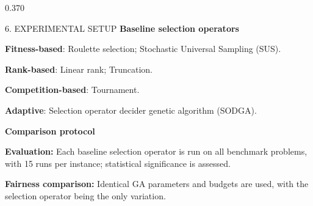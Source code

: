 \documentclass[final]{beamer}
\newcommand{\FSSubhead}{\fontsize{26}{32}\selectfont}    %
\newcommand{\FSBody}{\fontsize{24.5}{30.5}\selectfont}   %
\newcommand{\PosterSubheadGap}{2mm}
\newcommand{\postersubhead}[1]{{\color{bguBlue}\FSSubhead\bfseries #1}\par\vspace{\PosterSubheadGap}}
\newcommand{\leftcompactitem}[2]{%
  \par\vspace{2.0mm}\noindent
  \begin{minipage}[c]{0.11\linewidth}\centering\textcolor{bguMid}{\fontsize{27}{27}\selectfont #1}\end{minipage}%
  \hfill
  \begin{minipage}[c]{0.86\linewidth}\raggedright\FSBody #2\end{minipage}\par\vspace{2.0mm}}
\begin{document}
\begin{frame}[t]
\begin{columns}[t,onlytextwidth]
\begin{column}{0.370\paperwidth}
\begin{secbox}{6. EXPERIMENTAL SETUP}
\vspace{6mm}
\postersubhead{Baseline selection operators}
\vspace{1.5mm}
\leftcompactitem{\faChartPie}{\textbf{Fitness-based}: Roulette selection; Stochastic Universal Sampling (SUS).}
\vspace{2mm}
\leftcompactitem{\faSortAmountUp}{\textbf{Rank-based}: Linear rank; Truncation.}
\vspace{2mm}
\leftcompactitem{\faTrophy}{\textbf{Competition-based}: Tournament.}
\vspace{2mm}
\leftcompactitem{\faRandom}{\textbf{Adaptive}: Selection operator decider genetic algorithm (SODGA).}

\vspace{6mm}
\postersubhead{Comparison protocol}
\vspace{2mm}
\leftcompactitem{\faClipboardCheck}{\textbf{Evaluation:} Each baseline selection operator is run on all benchmark problems, with 15 runs per instance; statistical significance is assessed.}
\vspace{2mm}
\leftcompactitem{\faBullseye}{\textbf{Fairness comparison:} Identical GA parameters and budgets are used, with the selection operator being the only variation.}
\end{secbox}
\end{column}

\hfill


\end{columns}
\end{frame}
\end{document}
